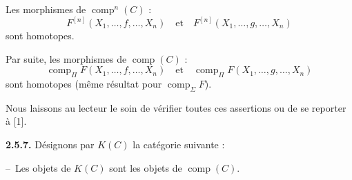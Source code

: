 Les morphismes de $\operatorname{comp}^{n}(C)$ :
\begin{equation*}
  F^{[n]}(X_1,\ldots,f,\ldots,X_n)
  \quad\text{et}\quad
  F^{[n]}(X_1,\ldots,g,\ldots,X_n)
\end{equation*}
sont homotopes.

Par suite, les morphismes de $\operatorname{comp}(C)$ :
\begin{equation*}
  \operatorname{comp}_{\Pi}F(X_1,\ldots,f,\ldots,X_n)
  \quad\text{et}\quad
  \operatorname{comp}_{\Pi}F(X_1,\ldots,g,\ldots,X_n)
\end{equation*}
sont homotopes (même résultat pour $\operatorname{comp}_{\Sigma}F$).

Nous laissons au lecteur le soin de vérifier toutes ces assertions ou de se
reporter à [1].

\noindent\textbf{2.5.7.}\quad
Désignons par $K(C)$ la catégorie suivante :

\noindent\hspace*{2em}--\ Les objets de $K(C)$ sont les objets de $\operatorname{comp}(C)$.
